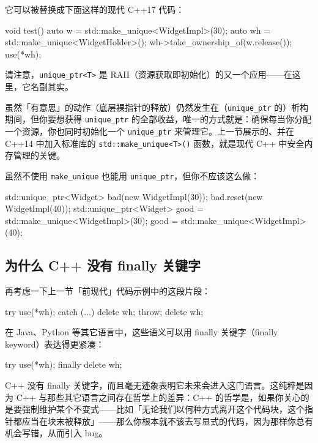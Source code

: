 它可以被替换成下面这样的现代 C++17 代码：

\begin{codebox}[cpp]
    void test() {
      auto w = std::make_unique<WidgetImpl>(30);
      auto wh = std::make_unique<WidgetHolder>();
      wh->take_ownership_of(w.release());
      use(*wh);
    }
\end{codebox}

请注意，\texttt{unique\_\allowbreak{}ptr<\allowbreak{}T>\allowbreak{}} 是 RAII（资源获取即初始化）的又一个应用——在这里，它名副其实。

虽然「有意思」的动作（底层裸指针的释放）仍然发生在（\texttt{unique\_\allowbreak{}ptr} 的）析构期间，但你要想获得 \texttt{unique\_\allowbreak{}ptr} 的全部收益，唯一的方式就是：确保每当你分配一个资源，你也同时初始化一个 \texttt{unique\_\allowbreak{}ptr} 来管理它。上一节展示的、并在 C++14 中加入标准库的 \texttt{std::\allowbreak{}make\_\allowbreak{}unique<\allowbreak{}T>\allowbreak{}(\allowbreak{})\allowbreak{}} 函数，就是现代 C++ 中安全内存管理的关键。

虽然不使用 \texttt{make\_\allowbreak{}unique} 也能用 \texttt{unique\_\allowbreak{}ptr}，但你不应该这么做：

\begin{codebox}[cpp]
    std::unique_ptr<Widget> bad(new WidgetImpl(30));
    bad.reset(new WidgetImpl(40));
    std::unique_ptr<Widget> good = std::make_unique<WidgetImpl>(30);
    good = std::make_unique<WidgetImpl>(40);
\end{codebox}

\subsection{为什么 C++ 没有 finally 关键字}

再考虑一下上一节「前现代」代码示例中的这段片段：

\begin{codebox}[cpp]
    try {
      use(*wh);
    } catch (...) {
      delete wh;
      throw;
    }
    delete wh;
\end{codebox}

在 Java、Python 等其它语言中，这些语义可以用 finally 关键字（finally keyword）表达得更紧凑：

\begin{codebox}[cpp]
    try {
      use(*wh);
    } finally {
      delete wh;
    }
\end{codebox}

C++ 没有 finally 关键字，而且毫无迹象表明它未来会进入这门语言。这纯粹是因为 C++ 与那些其它语言之间存在哲学上的差异：C++ 的哲学是，如果你关心的是要强制维护某个不变式——比如「无论我们以何种方式离开这个代码块，这个指针都应当在块末被释放」——那么你根本就不该去写显式的代码，因为那样你总有机会写错，从而引入 bug。

